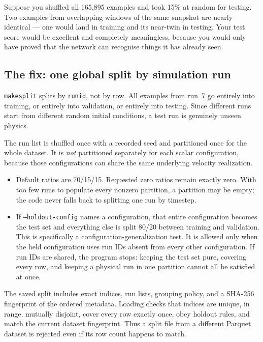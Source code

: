 \documentclass[11pt,a4paper]{report}
\newcommand{\code}[1]{\texttt{#1}}
\renewcommand{\_}{\origtextunderscore\allowbreak}
\begin{document}
Suppose you shuffled all 165{,}895 examples and took 15\% at random for testing. Two examples
from overlapping windows of the same snapshot are nearly identical --- one would land in
training and its near-twin in testing. Your test score would be excellent and completely
meaningless, because you would only have proved that the network can recognise things it has
already seen.

\subsection*{The fix: one global split by simulation run}

\code{make\_split} splits by \code{run\_id}, not by row. All examples from run~7 go
entirely into training, or entirely into validation, or entirely into testing. Since different
runs start from different random initial conditions, a test run is genuinely unseen physics.

The run list is shuffled once with a recorded seed and partitioned once for the whole dataset.
It is \emph{not} partitioned separately for each scalar configuration, because those
configurations can share the same underlying velocity realization.

\begin{itemize}
  \item Default ratios are 70/15/15. Requested zero ratios remain exactly zero. With too few
        runs to populate every nonzero partition, a partition may be empty; the code never
        falls back to splitting one run by timestep.
  \item If \code{--holdout-config} names a configuration, that entire configuration becomes the
        test set and everything else is split 80/20 between training and validation. This is
        specifically a configuration-generalization test. It is allowed only when the held
        configuration uses run IDs absent from every other configuration. If run IDs are
        shared, the program stops: keeping the test set pure, covering every row, and keeping
        a physical run in one partition cannot all be satisfied at once.
\end{itemize}

The saved split includes exact indices, run lists, grouping policy, and a SHA-256 fingerprint
of the ordered metadata. Loading checks that indices are unique, in range, mutually disjoint,
cover every row exactly once, obey holdout rules, and match the current dataset fingerprint.
Thus a split file from a different Parquet dataset is rejected even if its row count happens
to match.
\end{document}
